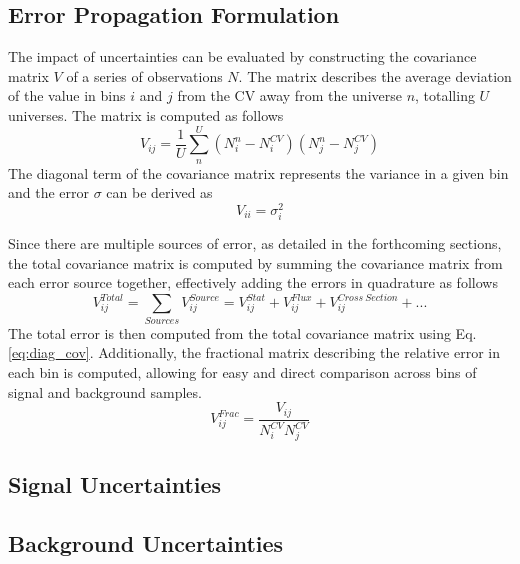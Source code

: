 \subsection{Error Propagation Formulation}
\label{sec:error_prop}

The impact of uncertainties can be evaluated by constructing the covariance matrix $V$ of a series of observations $N$.
The matrix describes the average deviation of the value in bins $i$ and $j$ from the CV away from the universe $n$, totalling $U$ universes.
The matrix is computed as follows
\begin{equation}
	V_{ij} = \frac{1}{U}\sum^{U}_{n} \left( N^n_{i} - N^{CV}_{i} \right) \left( N^n_{j} - N^{CV}_{j} \right)
\end{equation}
The diagonal term of the covariance matrix represents the variance in a given bin and the error $\sigma$ can be derived as
\begin{equation}
\label{eq:diag_cov}
	V_{ii} = \sigma^2_i
\end{equation}

Since there are multiple sources of error, as detailed in the forthcoming sections, the total covariance matrix is computed by summing the covariance matrix from each error source together, effectively adding the errors in quadrature as follows
\begin{equation}
	V^{Total}_{ij} = \sum_{Sources} V_{ij}^{Source} = V_{ij}^{Stat} + V_{ij}^{Flux} +V_{ij}^{Cross\ Section} + ...
\end{equation}
The total error is then computed from the total covariance matrix using Eq. \ref{eq:diag_cov}.
Additionally, the fractional matrix describing the relative error in each bin is computed, allowing for easy and direct comparison across bins of signal and background samples. 
\begin{equation}
	V_{ij}^{Frac} = \frac{V_{ij}}{N_i^{CV}N_j^{CV}}
\end{equation}

\subsection{Signal Uncertainties}

\subsection{Background Uncertainties}


